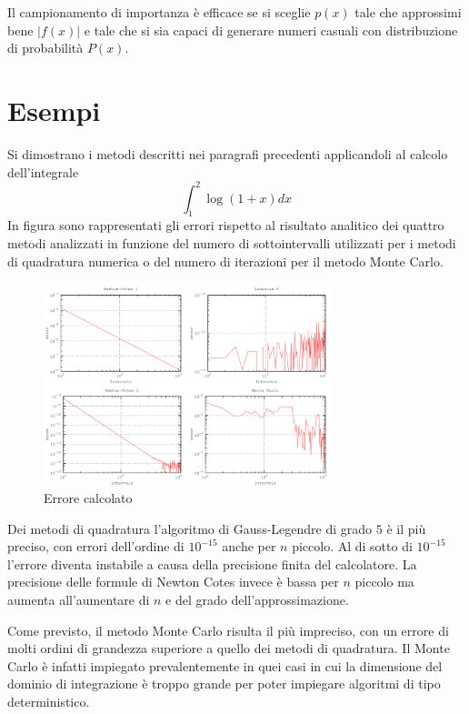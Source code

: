 Il campionamento di importanza è efficace se si sceglie $p(x)$ tale che approssimi bene $|f(x)|$ e tale che si sia capaci di generare numeri casuali con distribuzione di probabilità $P(x)$.

\section{Esempi}
Si dimostrano i metodi descritti nei paragrafi precedenti applicandoli al calcolo dell'integrale $$\int_1^2\log(1+x)dx$$
In figura sono rappresentati gli errori rispetto al risultato analitico dei quattro metodi analizzati in funzione del numero di sottointervalli utilizzati per i metodi di quadratura numerica o del numero di iterazioni per il metodo Monte Carlo.
\begin{figure}[H]
\centering
\includegraphics[width=0.75\textwidth]{integral}
\caption{Errore calcolato}
\label{fig:integral}
\end{figure}

Dei metodi di quadratura l'algoritmo di Gauss-Legendre di grado $5$ è il più preciso, con errori dell'ordine di $10^{-15}$ anche per $n$ piccolo. Al di sotto di $10^{-15}$ l'errore diventa instabile a causa della precisione finita del calcolatore. La precisione delle formule di Newton Cotes invece è bassa per $n$ piccolo ma aumenta all'aumentare di $n$ e del grado dell'approssimazione.

Come previsto, il metodo Monte Carlo risulta il più impreciso, con un errore di molti ordini di grandezza superiore a quello dei metodi di quadratura. Il Monte Carlo è infatti impiegato prevalentemente in quei casi in cui la dimensione del dominio di integrazione è troppo grande per poter impiegare algoritmi di tipo deterministico.
\\


